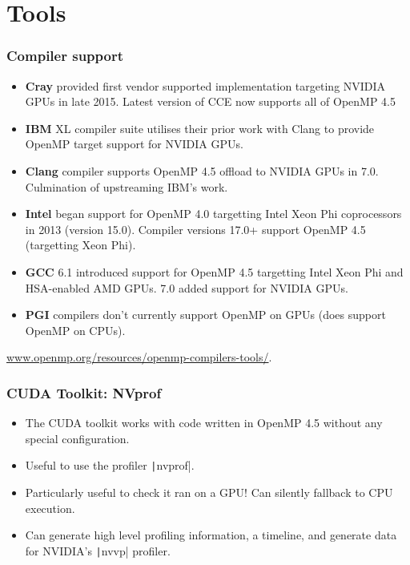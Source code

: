 \documentclass{beamer}
\begin{document}
\section{Tools}
\begin{frame}
\frametitle{Compiler support}
\begin{itemize}
  \item {\bf Cray} provided first vendor supported implementation targeting NVIDIA GPUs in late 2015. Latest version of CCE now supports all of OpenMP 4.5
  \item {\bf IBM} XL compiler suite utilises their prior work with Clang to provide OpenMP target support for NVIDIA GPUs.
  \item {\bf Clang} compiler supports OpenMP 4.5 offload to NVIDIA GPUs in 7.0. Culmination of upstreaming IBM's work.
  \item {\bf Intel} began support for OpenMP 4.0 targetting Intel Xeon Phi coprocessors in 2013 (version 15.0). Compiler versions 17.0+ support OpenMP 4.5 (targetting Xeon Phi).
  \item {\bf GCC} 6.1 introduced support for OpenMP 4.5 targetting Intel Xeon Phi and HSA-enabled AMD GPUs. 7.0 added support for NVIDIA GPUs.
  \item {\bf PGI} compilers don't currently support OpenMP on GPUs (does support OpenMP on CPUs).
\end{itemize}

\url{www.openmp.org/resources/openmp-compilers-tools/}.

\end{frame}

\begin{frame}
\frametitle{CUDA Toolkit: NVprof}
\begin{itemize}
  \item The CUDA toolkit works with code written in OpenMP 4.5 without any special configuration.
  \item Useful to use the profiler \texttt|nvprof|.
  \item Particularly useful to check it ran on a GPU! Can silently fallback to CPU execution.
  \item Can generate high level profiling information, a timeline, and generate data for NVIDIA's \texttt|nvvp| profiler.
\end{itemize}
\end{frame}
\end{document}
